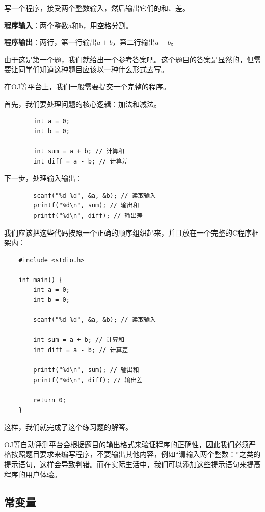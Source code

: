 \begin{exercise}[加减运算]
    写一个程序，接受两个整数输入，然后输出它们的和、差。

    \textbf{程序输入}：两个整数a和b，用空格分割。
    
    \textbf{程序输出}：两行，第一行输出$a+b$，第二行输出$a-b$。
\end{exercise}

\begin{answer}
    由于这是第一个题，我们就给出一个参考答案吧。这个题目的答案是显然的，但需要让同学们知道这种题目应该以一种什么形式去写。

    在OJ等平台上，我们一般需要提交一个完整的程序。

    首先，我们要处理问题的核心逻辑：加法和减法。
    \begin{verbatim}
        int a = 0;
        int b = 0;
        
        int sum = a + b; // 计算和
        int diff = a - b; // 计算差
    \end{verbatim}
    下一步，处理输入输出：
    \begin{verbatim}
        scanf("%d %d", &a, &b); // 读取输入
        printf("%d\n", sum); // 输出和
        printf("%d\n", diff); // 输出差
    \end{verbatim}
    我们应该把这些代码按照一个正确的顺序组织起来，并且放在一个完整的C程序框架内：
    \begin{verbatim}
    #include <stdio.h>

    int main() {
        int a = 0;
        int b = 0;
        
        scanf("%d %d", &a, &b); // 读取输入
        
        int sum = a + b; // 计算和
        int diff = a - b; // 计算差
        
        printf("%d\n", sum); // 输出和
        printf("%d\n", diff); // 输出差
        
        return 0;
    }
    \end{verbatim}
    这样，我们就完成了这个练习题的解答。

    OJ等自动评测平台会根据题目的输出格式来验证程序的正确性，因此我们必须严格按照题目要求来编写程序，不要输出其他内容，例如“请输入两个整数：”之类的提示语句，这样会导致判错。而在实际生活中，我们可以添加这些提示语句来提高程序的用户体验。
\end{answer}

\subsection{常变量}

